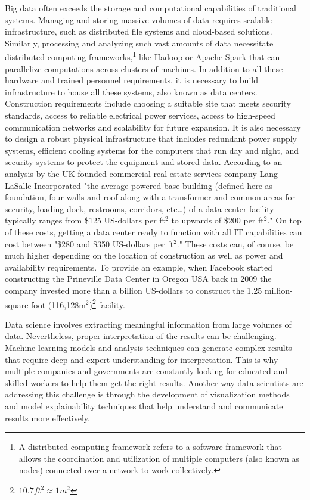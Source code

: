 \documentclass{vgtc}                          %
\begin{document}
Big data often exceeds the storage and computational capabilities of traditional systems. Managing and storing massive volumes of data requires scalable infrastructure, 
such as distributed file systems and cloud-based solutions. Similarly, processing and analyzing such vast amounts of data necessitate distributed computing 
frameworks,\footnote{A distributed computing framework refers to a software framework that allows the coordination and utilization of multiple computers (also known 
as nodes) connected over a network to work collectively.} like Hadoop or Apache Spark that can parallelize computations across clusters of machines. In addition to all these 
hardware and trained personnel requirements, it is necessary to build infrastructure to house all these systems, also known as data centers. Construction requirements include 
choosing a suitable site that meets security standards, access to reliable electrical power services, access to high-speed communication networks and scalability for future expansion. 
It is also necessary to design a robust physical infrastructure that includes redundant power supply systems, efficient cooling systems for the computers that run day and night, and 
security systems to protect the equipment and stored data. According to an analysis by the UK-founded commercial real estate services company Lang LaSalle Incorporated "the 
average-powered base building (defined here as foundation, four walls and roof along with a transformer and common areas for security, loading dock, restrooms, corridors, etc…) of a 
data center facility typically ranges from \$125 US-dollars per ft$^2$ to upwards of \$200 per ft$^2$."\cite{Hawkins:2022} On top of these costs, getting a data center ready to function 
with all IT capabilities can cost between "\$280 and \$350 US-dollars per ft$^2$."\cite{Hawkins:2022} These costs can, of course, be much higher depending on the location 
of construction as well as power and availability requirements. To provide an example, when Facebook started constructing the Prineville Data Center in Oregon USA back in 2009 the 
company invested more than a billion US-dollars to construct the 1.25 million-square-foot (116,128m$^2$)\footnote{$10.7ft^2 \approx 1m^2$} facility.\newline

Data science involves extracting meaningful information from large volumes of data. Nevertheless, proper interpretation of the results can be challenging. Machine learning 
models and analysis techniques can generate complex results that require deep and expert understanding for interpretation. This is why multiple companies and governments are 
constantly looking for educated and skilled workers to help them get the right results. Another way data scientists are addressing this challenge is through the development of 
visualization methods and model explainability techniques that help understand and communicate results more effectively.
\end{document}

